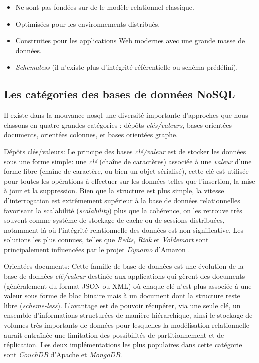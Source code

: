 \begin{itemize}\renewcommand\labelitemi{--}
\item Ne sont pas fondées sur de le modèle relationnel classique.
\item Optimisées pour les environnements distribués.
\item Construites pour les applications Web modernes avec une grande
  masse de données.
\item \emph{Schemaless} (il n'existe plus d'intégrité référentielle ou
  schéma prédéfini).
\end{itemize}

  \subsection{Les catégories des bases de données NoSQL}
  \label{sec:cat-nosql}
  Il existe dans la mouvance \acrshort{nosql} une diversité importante
  d'approches que nous classons en quatre grandes catégories
  \cite{sadalage2012nosql}: dépôts \textit {clés/valeurs}, bases
  orientées documents, orientées colonnes, et bases orientées
  graphe.\bigskip

  \textsf{Dépôts clés/valeurs}: Le principe des bases
  \textit{clé/valeur} est de stocker les données sous une forme
  simple: une \emph{clé } (chaîne de caractères) associée à une
  \emph{valeur} d'une forme libre (chaîne de caractère, ou bien un
  objet sérialisé), cette clé est utilisée pour toutes les opérations
  à effectuer sur les données telles que l'insertion, la mise à jour
  et la suppression. Bien que la structure est plus simple, la vitesse
  d'interrogation est extrêmement supérieur à la base de données
  relationnelles favorisant la scalabilité (\emph{scalability}) plus
  que la cohérence, on les retrouve très souvent comme système de
  stockage de cache ou de sessions distribuées, notamment là où
  l'intégrité relationnelle des données est non significative. Les
  solutions les plus connues, telles que \emph{Redis}, \emph{Riak} et
  \emph{Voldemort} sont principalement influencées par le projet
  \emph{Dynamo} d'Amazon \cite{decandia2007dynamo}.\bigskip

  \textsf{Orientées documents}: Cette famille de base de données est
  une évolution de la base de données \textit{clé/valeur} destinée aux
  applications qui gèrent des documents (généralement du format
  \textsc{JSON} ou \textsc{XML}) où chaque clé n'est plus associée à
  une valeur sous forme de bloc binaire mais à un document dont la
  structure reste libre (\textit{scheme-less}). L'avantage est de
  pouvoir récupérer, via une seule clé, un ensemble d’informations
  structurées de manière hiérarchique, ainsi le stockage de
  volumes très importants de données pour lesquelles la modélisation
  relationnelle aurait entraînée une limitation des possibilités de
  partitionnement et de réplication. Les deux implémentations les plus
  populaires dans cette catégorie sont \emph{CouchDB} d'Apache et
  \emph{MongoDB}.\bigskip

